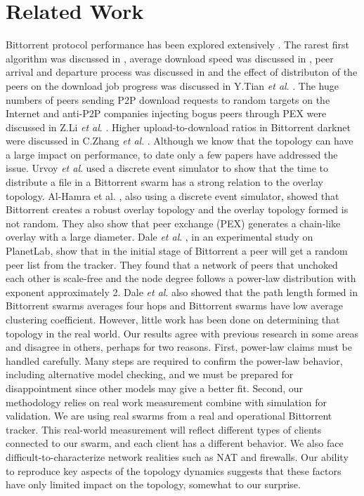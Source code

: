 \documentclass[paper]{ieice}
\begin{document}
\section{Related Work}\label{relatedworks}
Bittorrent protocol performance has been explored extensively \cite{guo2005measurements}\cite{legout2006rarest}\cite{pouwelse2004measurement}\cite{tian2007modeling}.  
The rarest first algorithm was discussed in \cite{legout2006rarest}, average download speed was discussed in \cite{pouwelse2004measurement}, peer arrival and departure process was discussed in \cite{guo2005measurements} and the effect of distributon of the peers on the download job progress was discussed in Y.Tian \textit{et al}. \cite{tian2007modeling}.
The huge numbers of peers sending P2P download requests to random targets on the Internet and anti-P2P companies injecting bogus peers through PEX were discussed in Z.Li \textit{et al}. \cite{li2010measurement}.
Higher upload-to-download ratios in  Bittorrent darknet were discussed in C.Zhang \textit{et al}. \cite{zhang2010bittorrent}.
Although we know that the topology can have a large impact on performance, to date only a few papers have addressed the issue.
Urvoy \textit{et al}. \cite{urvoy2007impact} used a discrete event simulator to show that the time to distribute a file in a Bittorrent swarm has a strong relation to the overlay topology.  
Al-Hamra et al. \cite{al2007understanding}, also using a discrete event simulator, showed that Bittorrent creates a robust overlay topology and the overlay topology formed is not random. 
They also show that peer exchange (PEX) generates a chain-like overlay with a large diameter. 
Dale \textit{et al}. \cite{dale2008evolution}, in an experimental study on PlanetLab, show that in the initial stage of Bittorrent a peer will get a random peer list from the tracker. 
They found that a network of peers that unchoked each other is scale-free and the node degree follows a power-law distribution with exponent approximately 2. 
Dale \textit{et al}. \cite{dale2008evolution} also showed that the path length formed in Bittorrent swarms averages four hops and Bittorrent swarms have low average clustering coefficient.  
However, little work has been done on determining that topology in the real world. 
Our results agree with previous research \cite{dale2008evolution} in some areas and disagree in others, perhaps for two reasons.
First, power-law claims must be handled carefully. 
Many steps are required to confirm the power-law behavior, including alternative model checking, and we must be prepared for disappointment since other models may give a better fit. 
Second, our methodology relies on real work measurement combine with simulation for validation. 
We are using real swarms from a real and operational Bittorrent tracker. 
This real-world measurement will reflect different types of clients connected to our swarm, and each client has a different behavior. 
We also face difficult-to-characterize network realities such as NAT and firewalls. 
Our ability to reproduce key aspects of the topology dynamics suggests that these factors have only limited impact on the topology, somewhat to our surprise.
\end{document}
